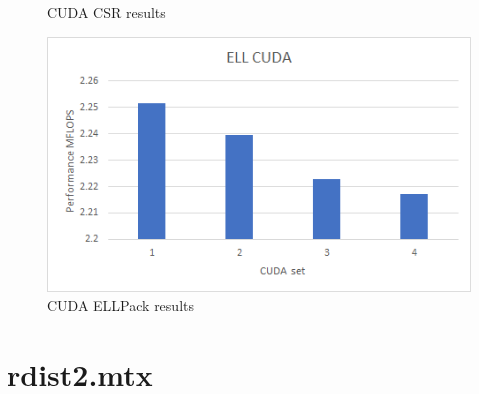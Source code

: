 \documentclass{scrreprt}
\begin{document}
\begin{figure}[ht]
\begin{minipage}[b]{0.5\linewidth}
    \caption{CUDA CSR results} 
    \vspace{4ex}
  \end{minipage}%
  \begin{minipage}[b]{0.5\linewidth}
    \centering
    \includegraphics[width=.9\linewidth]{mcfeELLCUDA.png} 
    \caption{CUDA ELLPack  results} 
    \vspace{4ex}
  \end{minipage} 
\end{figure}
\FloatBarrier






\section{rdist2.mtx}
\end{document}
